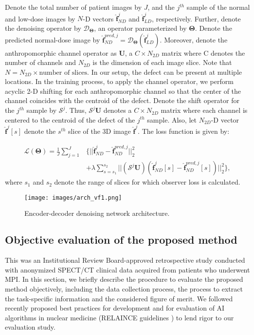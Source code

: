\documentclass[]{spie}  %
\def\L{{\cal L}}
\def\fhat{\hat{\boldsymbol{f}}}
\def\U{\boldsymbol{U}}
\def\S{\mathcal{S}}
\def\Th{\boldsymbol{\Theta}}
\def \L {\mathcal{L}}
\begin{document}
Denote the total number of patient images by $J$, and the $j^{th}$ sample of the normal and low-dose images by $N$-D vectors $\fhat_{ND}^j$ and $\fhat_{LD}^j$, respectively. Further, denote the denoising operator by $\mathcal{D}_{\Th}$, an operator parameterized by ${\Th}$. Denote the predicted normal-dose image by $\fhat_{ND}^{pred,j} = \mathcal{D}_{\Th}(\fhat_{LD}^j)$. Moreover, denote the anthropomorphic channel operator as $\U$, a $C \times N_{2D}$ matrix where C denotes the number of channels and $N_{2D}$ is the dimension of each image slice. Note that $N = N_{2D}\times \text{number of slices}$. In our setup, the defect can be present at multiple locations. In the training process, to apply the channel operator, we perform acyclic 2-D shifting for each anthropomorphic channel so that the center of the channel coincides with the centroid of the defect.  Denote the shift operator for the $j^{th}$ sample by $\mathcal{S}^j$. Thus, $\mathcal{S}^j\U$ denotes a $C \times N_{2D}$ matrix where each channel is centered to the centroid of the defect of the $j^{th}$ sample. Also, let $N_{2D}$-D vector $\fhat^j[s]$ denote the $s^{th}$ slice of the 3D image $\fhat^j$. The loss function is given by:

\begin{align*}
    \L(\Th) = \frac{1}{J}\sum_{j=1}^{J}&\Biggl\{||\fhat_{ND}^j-\fhat_{ND}^{pred,j}||_2^2 \\
    &+\lambda\sum_{s=s_1}^{s_2}||(\S^j\U)(\fhat_{ND}^j[s]-\fhat_{ND}^{pred,j}[s])||_2^2\Biggr\},
    \tag{1}\label{eq:loss_func}
\end{align*}
where $s_1$ and $s_2$ denote the range of slices for which observer loss is calculated.
\begin{figure}[h!]
\centering
\texttt{[image: images/arch\_vf1.png]}
\centering
\caption{Encoder-decoder denoising network architecture.}
\label{fig:arch}
\end{figure}

\subsection{Objective evaluation of the proposed method}
This was an Institutional Review Board-approved retrospective study conducted with anonymized SPECT/CT clinical data acquired from patients who underwent MPI. In this section, we briefly describe the procedure to evaluate the proposed method objectively, including the data collection process, the process to extract the task-specific information and the considered figure of merit. We followed recently proposed best practices for development and for evaluation of AI algorithms in nuclear medicine (RELAINCE guidelines \cite{jha2022nuclear}) to lend rigor to our evaluation study.
\end{document}
